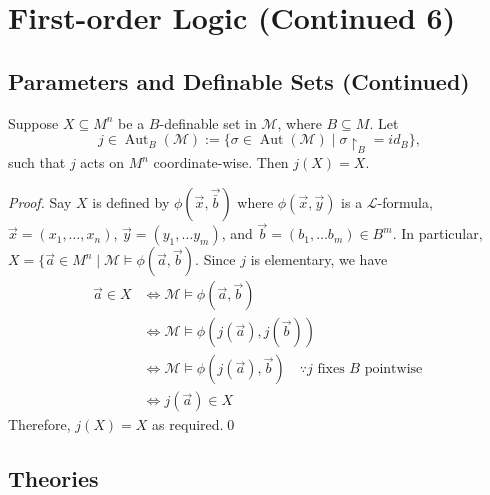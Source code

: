\documentclass[notoc,notitlepage]{tufte-book}
\DeclareMathOperator{\Aut}{Aut }
\begin{document}
\section{First-order Logic (Continued 6)}%
\label{sec:first_order_logic_continued_6}

\subsection{Parameters and Definable Sets (Continued)}%
\label{sub:parameters_and_definable_sets_continued}

\begin{crly}\label{crly:automorphisms_on_b_definable_sets}
  Suppose $X \subseteq M^n$ be a $B$-definable set in $\mathcal{M}$, where $B \subseteq M$. Let
  \begin{equation*}
    j \in \Aut_B(\mathcal{M}) := \{ \sigma \in \Aut(\mathcal{M}) \mid \sigma \restriction_B = id_B \},
  \end{equation*}
  such that $j$ acts on $M^n$ coordinate-wise. Then $j(X) = X$.
\end{crly}

\begin{proof}
  Say $X$ is defined by $\phi(\vec{x}, \vec{\bar{b}})$ where $\phi(\vec{x}, \vec{y})$ is a $\mathcal{L}$-formula, $\vec{x} = (x_1, \ldots, x_n)$, $\vec{y} = (y_1, \ldots y_m)$, and $\vec{b} = (b_1, \ldots b_m) \in B^m$. In particular, $X = \{ \vec{a} \in M^n \mid \mathcal{M} \models \phi(\vec{a}, \vec{b})$. Since $j$ is elementary, we have
    \begin{align*}
      \vec{a} \in X &\iff \mathcal{M} \models \phi(\vec{a}, \vec{b}) \\
                    &\iff \mathcal{M} \models \phi(j(\vec{a}), j(\vec{b})) \\
                    &\iff \mathcal{M} \models \phi(j(\vec{a}), \vec{b}) \quad \because j \text{ fixes } B \text{ pointwise } \\
                    &\iff j(\vec{a}) \in X
    \end{align*}
    Therefore, $j(X) = X$ as required.\qed\
\end{proof}


\subsection{Theories}%
\label{sub:theories}
\end{document}
